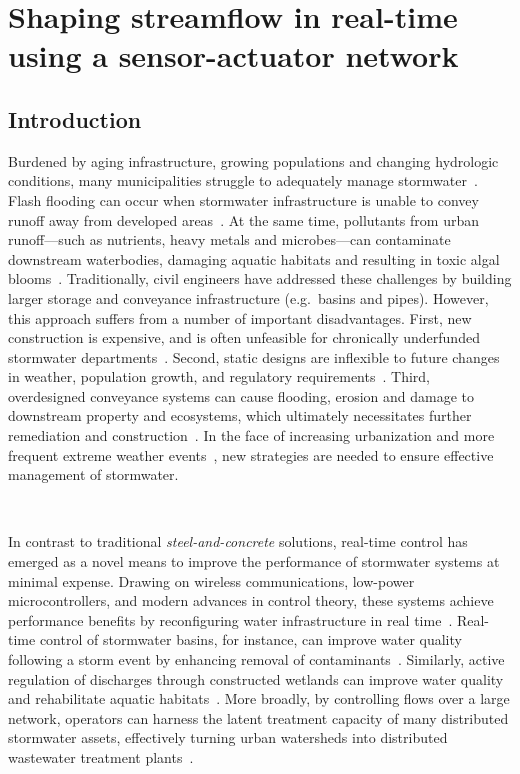 \chapter{Shaping streamflow in real-time using a sensor-actuator network}\label{ch:shaping}
\vspace{1cm}

\section{Introduction}


Burdened by aging infrastructure, growing populations and changing hydrologic conditions, many municipalities struggle to adequately manage stormwater~\cite{Kerkez2016SmarterSystems}.
Flash flooding can occur when stormwater infrastructure is unable to convey runoff away from developed areas~\cite{Wright_2017}.
At the same time, pollutants from urban runoff---such as nutrients, heavy metals and microbes---can contaminate downstream waterbodies, damaging aquatic habitats and resulting in toxic algal blooms~\cite{Kerkez2016SmarterSystems}. Traditionally, civil engineers have addressed these challenges by building larger storage and conveyance infrastructure (e.g.\ basins and pipes). However, this approach suffers from a number of important disadvantages. First, new construction is expensive, and is often unfeasible for chronically underfunded stormwater departments~\cite{Montestruque_2015}. Second, static designs are inflexible to future changes in weather, population growth, and regulatory requirements~\cite{Wright_2017}. Third, overdesigned conveyance systems can cause flooding, erosion and damage to downstream property and ecosystems, which ultimately necessitates further remediation and construction~\cite{Kerkez2016SmarterSystems}. In the face of increasing urbanization and more frequent extreme weather events~\cite{Bronstert_2002, stocker_2014}, new strategies are needed to ensure effective management of stormwater.

\

In contrast to traditional \textit{steel-and-concrete} solutions, real-time control has emerged as a novel means to improve the performance of stormwater systems at minimal expense. Drawing on wireless communications, low-power microcontrollers, and modern advances in control theory, these systems achieve performance benefits by reconfiguring water infrastructure in real time~\cite{Bartos_2018, Kerkez2016SmarterSystems}. Real-time control of stormwater basins, for instance, can improve water quality following a storm event by enhancing removal of contaminants~\cite{Kerkez2016SmarterSystems}. Similarly, active regulation of discharges through constructed wetlands can improve water quality and rehabilitate aquatic habitats~\cite{Mullapudi2017, Bartos_2018}. More broadly, by controlling flows over a large network, operators can harness the latent treatment capacity of many distributed stormwater assets, effectively turning urban watersheds into distributed wastewater treatment plants~\cite{Bartos_2018, Kerkez2016SmarterSystems}.

